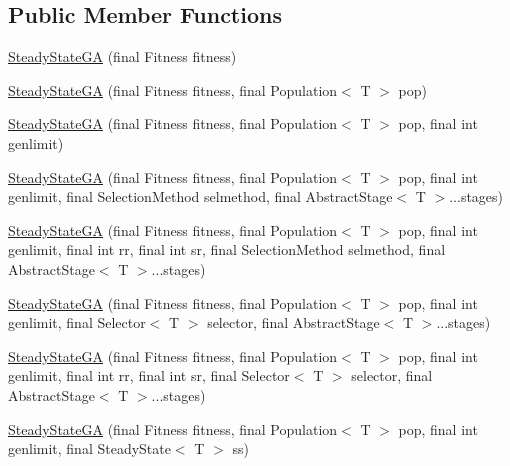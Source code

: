 \subsection*{Public Member Functions}
\begin{DoxyCompactItemize}
\item 
\hyperlink{classjenes_1_1algorithms_1_1_steady_state_g_a_3_01_t_01extends_01_chromosome_01_4_a0bd9f9195ccd7bb9f0a93bf467ee81d5}{Steady\-State\-G\-A} (final Fitness fitness)
\item 
\hyperlink{classjenes_1_1algorithms_1_1_steady_state_g_a_3_01_t_01extends_01_chromosome_01_4_a1fab107de8499953af703b619d2fc741}{Steady\-State\-G\-A} (final Fitness fitness, final Population$<$ T $>$ pop)
\item 
\hyperlink{classjenes_1_1algorithms_1_1_steady_state_g_a_3_01_t_01extends_01_chromosome_01_4_a6dba077ffc454a1863b7d15cecac32b4}{Steady\-State\-G\-A} (final Fitness fitness, final Population$<$ T $>$ pop, final int genlimit)
\item 
\hyperlink{classjenes_1_1algorithms_1_1_steady_state_g_a_3_01_t_01extends_01_chromosome_01_4_a5964a47d26b5831b9e821285e3e4cb8d}{Steady\-State\-G\-A} (final Fitness fitness, final Population$<$ T $>$ pop, final int genlimit, final Selection\-Method selmethod, final Abstract\-Stage$<$ T $>$...stages)
\item 
\hyperlink{classjenes_1_1algorithms_1_1_steady_state_g_a_3_01_t_01extends_01_chromosome_01_4_a7f95aed43d04c3290cc5fd98a569b6e0}{Steady\-State\-G\-A} (final Fitness fitness, final Population$<$ T $>$ pop, final int genlimit, final int rr, final int sr, final Selection\-Method selmethod, final Abstract\-Stage$<$ T $>$...stages)
\item 
\hyperlink{classjenes_1_1algorithms_1_1_steady_state_g_a_3_01_t_01extends_01_chromosome_01_4_a8dbf144ebf5f83e8d67e1e74c0e8c630}{Steady\-State\-G\-A} (final Fitness fitness, final Population$<$ T $>$ pop, final int genlimit, final Selector$<$ T $>$ selector, final Abstract\-Stage$<$ T $>$...stages)
\item 
\hyperlink{classjenes_1_1algorithms_1_1_steady_state_g_a_3_01_t_01extends_01_chromosome_01_4_a24e8cfdd1131b63cb1c3d086a6a09cf4}{Steady\-State\-G\-A} (final Fitness fitness, final Population$<$ T $>$ pop, final int genlimit, final int rr, final int sr, final Selector$<$ T $>$ selector, final Abstract\-Stage$<$ T $>$...stages)
\item 
\hyperlink{classjenes_1_1algorithms_1_1_steady_state_g_a_3_01_t_01extends_01_chromosome_01_4_a8e1b8939ca23670640b050dae1e239cc}{Steady\-State\-G\-A} (final Fitness fitness, final Population$<$ T $>$ pop, final int genlimit, final Steady\-State$<$ T $>$ ss)
\end{DoxyCompactItemize}
